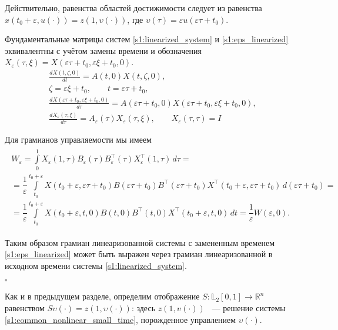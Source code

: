 \documentclass[../main.tex]{subfiles}
\begin{document}
\doc 
Действительно, равенства областей достижимости следует из равенства $ x(t_0 + \varepsilon, u(\cdot)) = z(1, \upsilon(\cdot)) $, где $ \upsilon(\tau) = \varepsilon u(\varepsilon \tau + t_0) $.

Фундаментальные матрицы систем \eqref{s1:linearized_system} и \eqref{s1:eps_linearized} эквивалентны с учётом замены времени и обозначения $ X_{\varepsilon}(\tau,\xi) = X(\varepsilon \tau + t_0,\varepsilon \xi + t_0, 0) $.
\begin{gather*}
	\frac{dX(t,\zeta, 0)}{dt} = A(t, 0) X(t,\zeta, 0), \\
	\zeta = \varepsilon \xi + t_0, \qquad t = \varepsilon \tau + t_0, \\
	\frac{dX(\varepsilon \tau + t_0, \varepsilon \xi + t_0, 0)}{d\tau} = A(\varepsilon \tau + t_0, 0) X(\varepsilon \tau + t_0,\varepsilon \xi + t_0, 0), \\
	\frac{dX_{ \varepsilon}(\tau,\xi)}{d\tau} = A_{\varepsilon}(\tau) X_{ \varepsilon}(\tau,\xi), \qquad X_{\varepsilon}(\tau,\tau) = I
\end{gather*}

Для грамианов управляемости мы имеем
\begin{gather*}
\begin{gathered}
 W_{\varepsilon} =
 \int\limits_0^1
 X_{ \varepsilon} (1,\tau)
 B_{\varepsilon}(\tau)
 B_{\varepsilon}^{\top}(\tau)
 X_{ \varepsilon}^{\top} (1,\tau) \, d\tau = \\
 = \dfrac{1}{\varepsilon} \int\limits_{t_0}^{t_0+\varepsilon}
 X(t_0+\varepsilon,\varepsilon \tau + t_0)
 B(\varepsilon \tau + t_0)
 B^{\top}(\varepsilon \tau + t_0)
 X^{\top}(t_0+\varepsilon,\varepsilon \tau + t_0) \,
 d\left( \varepsilon\tau + t_0\right) = \\ =
 \dfrac{1}{\varepsilon} \int\limits_{t_0}^{t_0+\varepsilon}
 X(t_0+\varepsilon,t, 0)
 B(t, 0)
 B^{\top}(t, 0)
 X^{\top}(t_0+\varepsilon,t, 0) \, dt = \dfrac{1}{\varepsilon} W(\varepsilon, 0). 
\end{gathered}
\end{gather*}

Таким образом грамиан линеаризованной системы с замененным временем \eqref{s1:eps_linearized} может быть выражен через грамиан линеаризованной в исходном времени системы \eqref{s1:linearized_system}. 

\hfill $\square$
 
Как и в предыдущем разделе, определим отображение $S: \mathbb{L}_2[0,1] \rightarrow \mathbb{R}^n $ равенством $S\upsilon(\cdot) = z(1,\upsilon(\cdot))$: здесь $ z(1,\upsilon(\cdot))$ ~--- решение системы \eqref{s1:common_nonlinear_small_time}, порожденное управлением $\upsilon(\cdot)$. 
 
\end{document}

